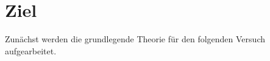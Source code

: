 \section{Ziel}
\label{sec:Ziel}

Zunächst werden die grundlegende Theorie für den folgenden Versuch aufgearbeitet.